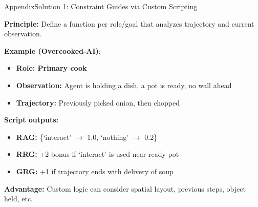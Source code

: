 \begin{frame}{Appendix}{Solution 1: Constraint Guides via Custom Scripting}

\textbf{Principle:} Define a function per role/goal that analyzes trajectory and current observation.

\vspace{0.5em}
\textbf{Example (Overcooked-AI)}:

\begin{itemize}
  \item \textbf{Role: Primary cook}
  \item \textbf{Observation:} Agent is holding a dish, a pot is ready, no wall ahead
  \item \textbf{Trajectory:} Previously picked onion, then chopped
\end{itemize}

\textbf{Script outputs:}

\begin{itemize}
  \item \textbf{RAG:} \{`interact' $\rightarrow$ 1.0, `nothing' $\rightarrow$ 0.2\}
  \item \textbf{RRG:} +2 bonus if `interact' is used near ready pot
  \item \textbf{GRG:} +1 if trajectory ends with delivery of soup
\end{itemize}

\textbf{Advantage:} Custom logic can consider spatial layout, previous steps, object held, etc.

\end{frame}


